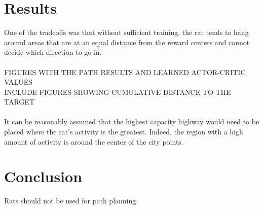 \documentclass[conference]{IEEEtran}
\begin{document}
\section{Results}

One of the tradeoffs was that without sufficient training, the rat tends to hang around areas that are at an equal distance from the reward centers and cannot decide which direction to go in. \\
\\
FIGURES WITH THE PATH RESULTS AND LEARNED ACTOR-CRITIC VALUES\\
INCLUDE FIGURES SHOWING CUMULATIVE DISTANCE TO THE TARGET\\
\\
It can be reasonably assumed that the highest capacity highway would need to be placed where the rat's activity is the greatest. Indeed, the region with a high amount of activity is around the center of the city points. 

\section{Conclusion}
Rats should not be used for path planning






\end{document}
